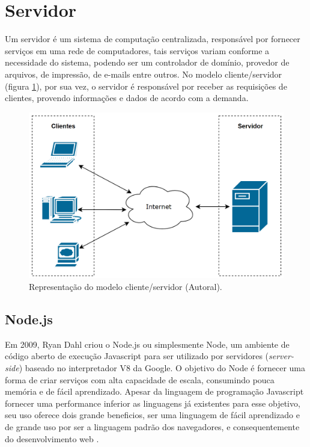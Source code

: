 \section{Servidor}
\label{fund:servidor}
Um servidor é um sistema de computação centralizada, responsável por fornecer serviços em uma rede de computadores, tais serviços variam conforme a necessidade do sistema, podendo ser um controlador de domínio, provedor de arquivos, de impressão, de e-mails entre outros. No modelo cliente/servidor (figura \ref{fig:client-server-model}), por sua vez, o servidor é responsável por receber as requisições de clientes, provendo informações e dados de acordo com a demanda.

\begin{figure}[H]
  \centering
  \includegraphics[width=.80\textwidth]{assets/client-server-model.png} 
  \caption{Representação do modelo cliente/servidor (Autoral).}
  \label{fig:client-server-model} 
\end{figure}

\subsection{Node.js}
\label{fund:node}
Em 2009, Ryan Dahl criou o Node.js ou simplesmente Node, um ambiente de código aberto de execução Javascript para ser utilizado por servidores (\textit{server-side}) baseado no interpretador V8 da Google. O objetivo do Node é fornecer uma forma de criar serviços com alta capacidade de escala, consumindo pouca memória e de fácil aprendizado. Apesar da linguagem de programação Javascript fornecer uma performance inferior as linguagens já existentes para esse objetivo, seu uso oferece dois grande beneficios, ser uma linguagem de fácil aprendizado e de grande uso por ser a linguagem padrão dos navegadores, e consequentemente do desenvolvimento web \cite{tilkov2010node}.

